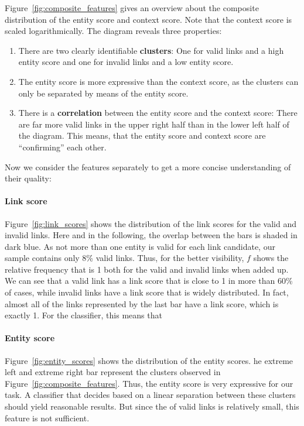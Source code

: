Figure~\ref{fig:composite_features} gives an overview about the composite distribution of the entity score and context score. Note that the context score is scaled logarithmically. The diagram reveals three properties:

\begin{enumerate}
\item There are two clearly identifiable \textbf{clusters}: One for valid links and a high entity score and one for invalid links and a low entity score. 

\item The entity score is more expressive than the context score, as the clusters can only be separated by means of the entity score.

\item There is a \textbf{correlation} between the entity score and the context score: There are far more valid links in the upper right half than in the lower left half of the diagram. This means, that the entity score and context score are "`confirming"' each other.
\end{enumerate}

Now we consider the features separately to get a more concise understanding of their quality:

\paragraph{Link score}
Figure~\ref{fig:link_scores} shows the distribution of the link scores for the valid and invalid links. Here and in the following, the overlap between the bars is shaded in dark blue. As not more than one entity is valid for each link candidate, our sample contains only 8\% valid links. Thus, for the better visibility, $f$ shows the relative frequency that is 1 both for the valid and invalid links when added up. We can see that a valid link has a link score that is close to 1 in more than 60\% of cases, while invalid links have a link score that is widely distributed. In fact, almost all of the links represented by the last bar have a link score, which is exactly 1. For the classifier, this means that

\paragraph{Entity score}
Figure~\ref{fig:entity_scores} shows the distribution of the entity scores. he extreme left and extreme right bar represent the clusters observed in Figure~\ref{fig:composite_features}. Thus, the entity score is very expressive for our task. A classifier that decides based on a linear separation between these clusters should yield reasonable results. But since the of valid links is relatively small, this feature is not sufficient.

